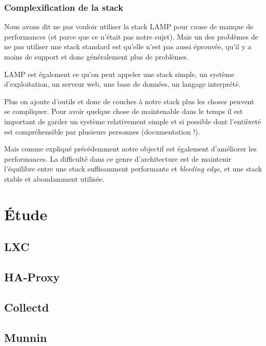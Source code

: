 \documentclass[a4paper,10pt,one side,titlepage]{report}
\begin{document}
\section{Complexification de la stack}
Nous avons dit ne pas vouloir utiliser la stack LAMP pour
cause de manque de performances (et parce que ce n'était pas notre sujet). Mais un
des problèmes de ne pas utiliser une stack standard est qu'elle n'est pas aussi 
éprouvée, qu'il y a moins de support et donc généralement plus de problèmes.

LAMP est également ce qu'on peut appeler une stack simple, un système d'exploitation,
un serveur web, une base de données, un langage interprété.

Plus on ajoute d'outils et donc de couches à notre stack plus les choses peuvent se compliquer. Pour avoir quelque chose de maintenable dans le temps il est important
de garder un système relativement simple et si possible dont l'entièreté est
compréhensible par plusieurs personnes (documentation !).

Mais comme expliqué précédemment notre objectif est également d'améliorer les 
performances. La difficulté dans ce genre d'architecture est de maintenir l'équilibre 
entre une stack suffisamment performante et \textit{bleeding edge}, et une stack 
stable et abondamment utilisée.



\part{Étude}
\chapter{LXC}


\chapter{HA-Proxy}


\chapter{Collectd}


\chapter{Munnin}

\end{document}
